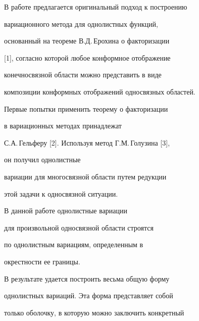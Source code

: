 \date{}




\pagestyle{plain} %







\maketitle


\label{begin}











В работе предлагается оригинальный подход к построению


вариационного метода для однолистных функций,


основанный на теореме В.Д.\,Ерохина о факторизации


[1], согласно которой любое конформное отображение 


конечносвязной области можно представить в виде


композиции конформных отображений односвязных областей.


Первые попытки применить теорему о факторизации 


в вариационных методах принадлежат 


С.А.\,Гельферу [2]. Используя метод Г.М.\,Голузина [3], 


он получил однолистные 


вариации для многосвязной области путем редукции 


этой задачи к односвязной ситуации. 





В данной работе однолистные вариации 


для произвольной односвязной области строятся


по однолистным вариациям, определенным в 


окрестности ее границы.


В результате удается построить весьма общую форму


однолистных вариаций. Эта форма представляет собой


только оболочку, в которую можно заключить конкретный


